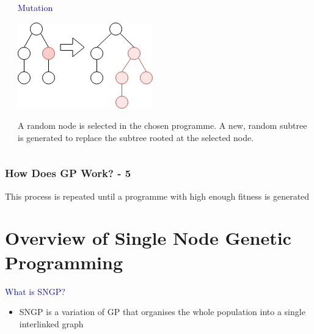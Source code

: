 \documentclass{beamer}
\newcommand{\blue}[1]{\textcolor{blue}{#1}}
\begin{document}
\begin{frame}
\begin{frame}
\begin{columns}[T]
\begin{column}{0.4\textwidth}
				\end{column}
			
				\pause
			
				\begin{column}{0.3\textwidth}
					
					\blue{Mutation}
					
					\medskip
					
					\includegraphics[scale=0.35]{resources/7_mutation}
					
					\begin{small}
						A random node is selected in the chosen programme. A new, random subtree is generated to replace the subtree rooted at the selected node.
					\end{small}
				\end{column}
				
			\end{columns}
			
		\end{frame}
	
		\begin{frame}
		
			\frametitle{How Does GP Work? - 5}
			
			This process is repeated until a programme with high enough fitness is generated
		
		\end{frame}
	
	
	\section{Overview of Single Node Genetic Programming}

		\begin{frame}
			
			\large{\blue{What is SNGP?}}
			
			\medskip
			
			\pause
			
			\begin{itemize}
				\item SNGP is a variation of GP that organises the whole population into a single interlinked graph
				

\end{itemize}
\end{frame}
\end{frame}
\end{document}
